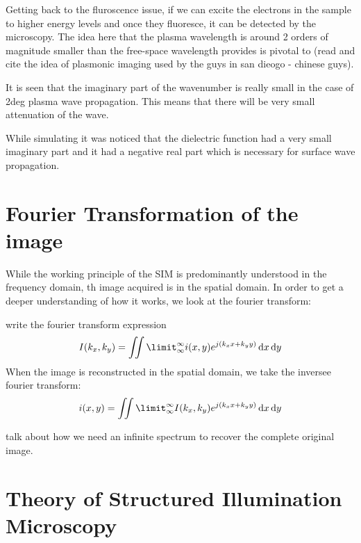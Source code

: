 \documentclass[11pt]{article}
\begin{document}
Getting back to the fluroscence issue, if we can excite the electrons in the sample to higher energy levels and once they fluoresce, it can be detected by the microscopy. The idea here that the plasma wavelength is around 2 orders of magnitude smaller than the free-space wavelength provides is pivotal to (read and cite the idea of plasmonic imaging used by the guys in san dieogo - chinese guys).

It is seen that the imaginary part of the wavenumber is really small in the case of 2deg plasma wave propagation. This means that there will be very small attenuation of the wave.

While simulating it was noticed that the dielectric function had a very small imaginary part and it had a negative real part which is necessary for surface wave propagation.

\section{Fourier Transformation of the image}

While the working principle of the SIM is predominantly understood in the frequency domain, th image acquired is in the spatial domain. In order to get a deeper understanding of how it works, we look at the fourier transform:

write the fourier transform expression
\begin{equation}
  I(k_x, k_y) = \iint \limit_{\inf}^{\inf} i(x,y) e^{j (k_x x + k_y y)} \diff x \diff y
  \label{eq:FT}
\end{equation}
When the image is reconstructed in the spatial domain, we take the inversee fourier transform:
\begin{equation}
  i(x, y) = \iint \limit_{\inf}^{\inf} I(k_x,k_y) e^{j (k_x x + k_y y)} \diff x \diff y
  \label{eq:IFT}
\end{equation}

talk about how we need an infinite spectrum to recover the complete original image.

\section{Theory of Structured Illumination Microscopy}
\end{document}
